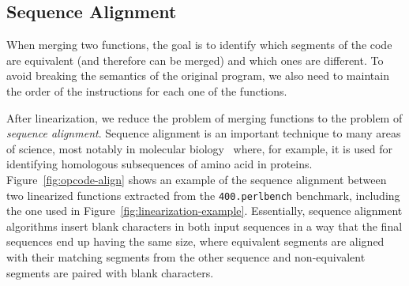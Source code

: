 

\subsection{Sequence Alignment}

When merging two functions, the goal is to identify which segments of the code are equivalent (and therefore can be merged) and which ones are different.
To avoid breaking the semantics of the original program, we also need to maintain the order of the instructions for each one of the functions.

After linearization, we reduce the problem of merging functions to the problem of \textit{sequence alignment}. Sequence alignment is an important technique to many areas of science, most notably in molecular biology~\cite{needleman70,smith81,carrillo88,wang94} where, for
example, it is used for identifying homologous subsequences of amino acid in proteins.
Figure~\ref{fig:opcode-align} shows an example of
the sequence alignment between two linearized functions extracted from the \texttt{400.perlbench} benchmark, including the one used in
Figure~\ref{fig:linearization-example}.
Essentially, sequence alignment algorithms insert blank characters in both input sequences in a way that
the final sequences end up having the same size, where equivalent segments are aligned with their matching segments from the other sequence
and non-equivalent segments are paired with blank characters.

